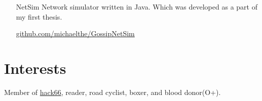 \documentclass[margin, 10pt]{res} %
\begin{document}
\begin{resume}
\begin{itemize}
\item[NetSim] Network simulator written in Java.
Which was developed as a part of my first thesis.

\href{https://github.com/michaelthe/GossipNetSim}{github.com/michaelthe/GossipNetSim}

\end{itemize}

\section{Interests}

Member of \href{http://hack66.info/}{hack66}, reader, road cyclist, boxer, and blood donor(O+).

\end{resume}
\end{document}
